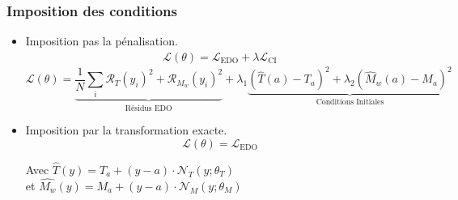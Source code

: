 \documentclass[handout]{beamer}
\newtheorem{pbm et hypo}[thm]{Problématique et hypothèses}
\begin{document}
	
	\begin{frame}
		\frametitle{Imposition des conditions}
		\begin{itemize}
			\item[\maltese] Imposition pas la pénalisation.\pause			
			\begin{align}
				\mathcal{L}( \theta ) = \mathcal{L}_{\text{EDO}} + \lambda\mathcal{L}_{\text{CI}}
			\end{align}
			\small\[
			\mathcal{L}(\theta) = \underbrace{\frac{1}{N}\sum_i \mathcal{R}_T(y_i)^2 + \mathcal{R}_{M_w}(y_i)^2}_{\text{Résidus EDO}} + \lambda_1 \underbrace{(\hat{T}(a)-T_a)^2 + \lambda_2 (\hat{M}_w(a)-M_a)^2}_{\text{Conditions Initiales}}
			\]
			\item[\maltese]  Imposition par la transformation exacte. \pause
			\begin{equation}
				\mathcal{L}( \theta ) = \mathcal{L}_{\text{EDO}}
			\end{equation}
			
			{ Avec } $\hat{T}(y) = T_{a} + (y-a) \cdot\mathcal{N}_T(y; \theta_T)$  \\
			\vspace{1ex}
			et $ \hat{M_w}(y) = M_{a}+ (y-a)\cdot\mathcal{N}_M(y; \theta_M)$
		\end{itemize}
	\end{frame}
	
\end{document}
